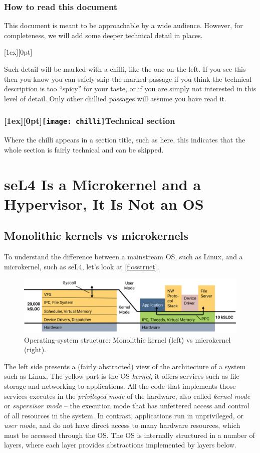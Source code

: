 \documentclass[english,a4paper,12pt]{report}
\newcommand{\Sect}[1]{\section{#1}}
\newcommand{\SSect}[1]{\subsection{#1}}
\newcommand{\SSSect}[1]{\subsubsection*{#1}}
\newcommand{\Sect}[1]{\chapter{#1}}
\newcommand{\SSect}[1]{\section{#1}}
\newcommand{\SSSect}[1]{\subsection*{#1}}
\newlength{\chillilng}\setlength{\chillilng}{8mm}
\newlength{\chillimarg}\setlength{\chillimarg}{10mm}
\newcommand{\chilli}{\texttt{[image: chilli]}}
\newcommand{\chilliItem}{\raisebox{-5mm}[1ex][0pt]{%
      \makebox[\chillilng][r]{\chilli}}}
\newcommand{\chilliSect}{\raisebox{-2mm}[1ex][0pt]{\chilli\hspace{0.8em}}}
\newenvironment{Chilli}{
    \begin{list}{}{
      \setlength{\labelwidth}{\chillilng}
      \setlength{\leftmargin}{\chillimarg}}
    \item[\chilliItem]
    }
  {\end{list}}
\begin{document}
  \SSSect{How to read this document}

  This document is meant to be approachable by a wide
  audience. However, for completeness, we will add some deeper
  technical detail in places.

  \begin{Chilli}
    Such detail will be marked with a chilli, like the one on the left. If you
    see this then you know you can safely skip the marked passage if
    you think the technical description is too ``spicy'' for your
    taste, or if you are simply not interested in this level of
    detail. Only other chillied passages will assume you have read it.
  \end{Chilli}

  \SSSect{\chilliSect Technical section}
  Where the chilli appears in a section title, such as here, this
  indicates that the whole section is fairly technical and can be skipped.

  \Sect{seL4 Is a Microkernel and a Hypervisor, It Is Not an
    OS}\label{s:ukernel}

  \SSect{Monolithic kernels vs microkernels}

  To understand the difference between a mainstream OS, such as Linux,
  and a microkernel, such as seL4, let's look at
  \autoref{f:osstruct}.

  \begin{figure}[hb]
    \centering
    \includegraphics[width=1.0\textwidth]{kernel}
    \caption[Operating-system structure.]{Operating-system structure:
      Monolithic kernel (left) vs microkernel (right).}
    \label{f:osstruct}
  \end{figure}

  The left side presents a (fairly abstracted) view of the
  architecture of a system such as Linux. The yellow part is the OS
  \emph{kernel}, it offers services such as file storage and
  networking to applications.  All the code that implements those
  services executes in the \emph{privileged mode} of the hardware,
  also called \emph{kernel mode} or \emph{supervisor mode} --
  the execution mode that has unfettered access and control of all
  resources in the system. In contrast, applications run in
  unprivileged, or \emph{user mode}, and do not have direct access to
  many hardware resources, which must be accessed through the OS. The
  OS is internally structured in a number of layers, where each layer
  provides abstractions implemented by layers below.
\end{document}
